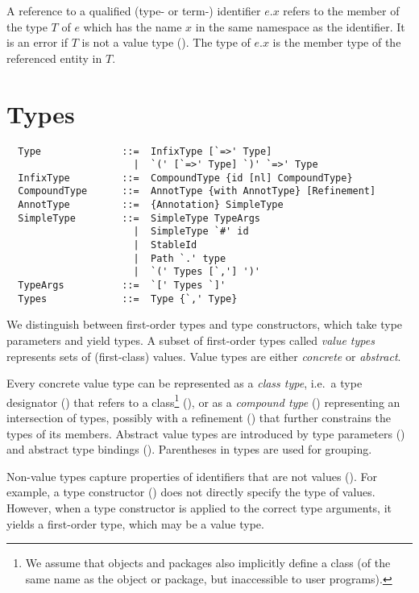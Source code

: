 A reference to a qualified (type- or term-) identifier $e.x$ refers to
the member of the type $T$ of $e$ which has the name $x$ in the same
namespace as the identifier. It is an error if $T$ is not a value type
(). The type of $e.x$ is the member type of the
referenced entity in $T$.

\chapter{\label{sec:types}Types}

\syntax\begin{lstlisting}
  Type              ::=  InfixType [`=>' Type]
                      |  `(' [`=>' Type] `)' `=>' Type
  InfixType         ::=  CompoundType {id [nl] CompoundType}
  CompoundType      ::=  AnnotType {with AnnotType} [Refinement]
  AnnotType         ::=  {Annotation} SimpleType
  SimpleType        ::=  SimpleType TypeArgs
                      |  SimpleType `#' id
                      |  StableId
                      |  Path `.' type
                      |  `(' Types [`,'] ')'
  TypeArgs          ::=  `[' Types `]'
  Types             ::=  Type {`,' Type}
\end{lstlisting}

We distinguish between first-order types and type constructors, which
take type parameters and yield types. A subset of first-order types
called {\em value types} represents sets of (first-class) values.
Value types are either {\em concrete} or {\em abstract}. 

Every concrete value type can be represented as a {\em class type}, i.e.\ a
type designator () that refers to a
class\footnote{We assume that objects and packages also implicitly
define a class (of the same name as the object or package, but
inaccessible to user programs).} (), or as a {\em
compound type} () representing an
intersection of types, possibly with a refinement
() that further constrains the types of its
members.
Abstract value types are introduced by type parameters () and abstract type bindings (). Parentheses in types are used for
grouping.

Non-value types capture properties of identifiers that are not values
(). For example, a type constructor () does not directly specify the type of values. However, when a type constructor is applied to the correct type arguments, it yields a first-order type, which may be a value type. 


